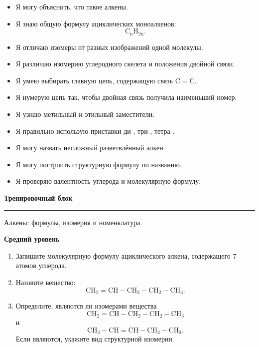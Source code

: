 \documentclass[a4paper,12pt]{article}
\newcommand{\sublesson}[1]{%
    \vspace{0.4em}
    {\large\bfseries\color{accent}#1}\par
}
\begin{document}
\begin{itemize}
    \item Я могу объяснить, что такое алкены.
    \item Я знаю общую формулу ациклических моноалкенов:
    \[
    \mathrm{C_nH_{2n}}.
    \]
    \item Я отличаю изомеры от разных изображений одной молекулы.
    \item Я различаю изомерию углеродного скелета и положения двойной связи.
    \item Я умею выбирать главную цепь, содержащую связь \(\mathrm{C=C}\).
    \item Я нумерую цепь так, чтобы двойная связь получила наименьший номер.
    \item Я узнаю метильный и этильный заместители.
    \item Я правильно использую приставки ди-, три-, тетра-.
    \item Я могу назвать несложный разветвлённый алкен.
    \item Я могу построить структурную формулу по названию.
    \item Я проверяю валентность углерода и молекулярную формулу.
\end{itemize}

\clearpage

\begin{center}
{\LARGE\bfseries\color{darkaccent}Тренировочный блок}

\vspace{0.25em}

{\color{linegray}\rule{0.82\linewidth}{0.8pt}}

\vspace{0.4em}

\textcolor{textgray}{Алкены: формулы, изомерия и номенклатура}
\end{center}

\sublesson{Средний уровень}

\begin{enumerate}[label=\textbf{\arabic*.}]

\item Запишите молекулярную формулу ациклического алкена, содержащего \(7\) атомов углерода.

\item Назовите вещество:
\[
\mathrm{CH_2=CH-CH_2-CH_2-CH_3}.
\]

\item Определите, являются ли изомерами вещества
\[
\mathrm{CH_2=CH-CH_2-CH_2-CH_3}
\]
и
\[
\mathrm{CH_3-CH=CH-CH_2-CH_3}.
\]
Если являются, укажите вид структурной изомерии.

\end{enumerate}
\end{document}

